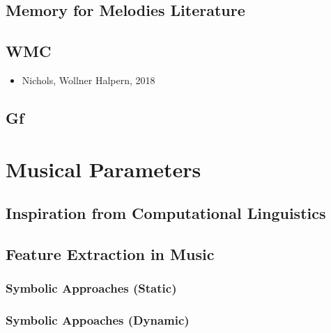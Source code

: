 \documentclass[]{book}
\providecommand{\tightlist}{%
  \setlength{\itemsep}{0pt}\setlength{\parskip}{0pt}}
\theoremstyle{definition}
\theoremstyle{definition}
\theoremstyle{definition}
\theoremstyle{remark}
\begin{document}
\hypertarget{memory-for-melodies-literature}{%
\section{Memory for Melodies
Literature}\label{memory-for-melodies-literature}}

\hypertarget{wmc}{%
\section{WMC}\label{wmc}}

\begin{itemize}
\tightlist
\item
  Nichols, Wollner Halpern, 2018
\end{itemize}

\hypertarget{gf}{%
\section{Gf}\label{gf}}

\hypertarget{musical-parameters}{%
\chapter{Musical Parameters}\label{musical-parameters}}

\hypertarget{inspiration-from-computational-linguistics}{%
\section{Inspiration from Computational
Linguistics}\label{inspiration-from-computational-linguistics}}

\hypertarget{feature-extraction-in-music}{%
\section{Feature Extraction in
Music}\label{feature-extraction-in-music}}

\hypertarget{symbolic-approaches-static}{%
\subsection{Symbolic Approaches
(Static)}\label{symbolic-approaches-static}}

\hypertarget{symbolic-appoaches-dynamic}{%
\subsection{Symbolic Appoaches
(Dynamic)}\label{symbolic-appoaches-dynamic}}
\end{document}
